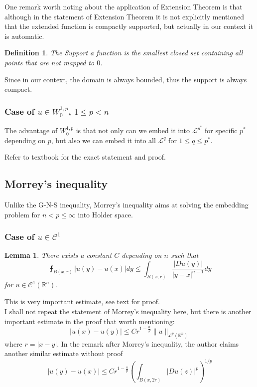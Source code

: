 \documentclass{article}
\begin{document}
One remark worth noting about the application of Extension Theorem is that although in the statement of Extension Theorem it is not explicitly mentioned that the extended function is compactly supported, but actually in our context it is automatic. 

\newtheorem{Def}{Definition}[section]
\begin{Def}
    The Support a function is the smallest closed set containing all points that are not mapped to $0$.
\end{Def}

Since in our context, the domain is always bounded, thus the support is always compact.

\subsubsection{Case of $u\in W^{1,p}_{0}$, $1\leq p< n$}

\indent\indent The advantage of $W^{1,p}_0$ is that not only can we embed it into $\mathscr{L}^{p^*}$ for specific $p^*$ depending on $p$, but also we can embed it into all $\mathscr{L}^{q}$ for $1\leq q\leq p^*$.

Refer to textbook for the exact statement and proof.

\subsection{Morrey's inequality}

\indent\indent Unlike the G-N-S inequality, Morrey's inequality aims at solving the embedding problem for $n<p\leq \infty$ into Holder space.

\subsubsection{Case of $u\in \mathscr{C}^{1}$}

\newtheorem{Lem}{Lemma}
\begin{Lem}
    There exists a constant $C$ depending on $n$ such that 
    $$
    \intbar_{B(x,r)}|u(y)-u(x)|dy\leq\int_{B(x,r)}\frac{|Du(y)|}{|y-x|^{n-1}}dy
    $$
    for $u\in\mathscr{C}^1(\mathbb{R}^n)$.
\end{Lem} 

This is very important estimate, see text for proof. \\

I shall not repeat the statement of Morrey's inequality here, but there is another important estimate in the proof that worth mentioning:
$$
    |u(x)-u(y)|\leq Cr^{1-\frac{n}{p}}\|u\|_{\mathscr{L}^p(\mathbb{R}^n)}
$$ where $r=|x-y|$. In the remark after Morrey's inequality, the author claims another similar estimate without proof
$$
    |u(y)-u(x)|\leq Cr^{1-\frac{n}{p}}\left(\int_{B(x,2r)}|Du(z)|^p\right)^{1/p}
$$
\end{document}
